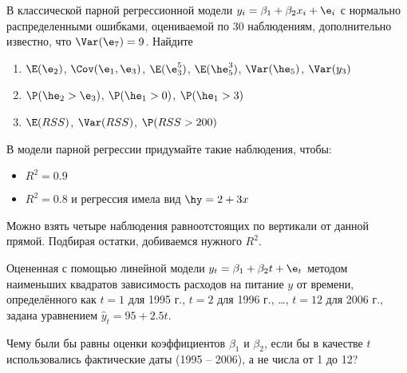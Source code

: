 \documentclass[pdftex,11pt,openany]{book}\usepackage[]{graphicx}\usepackage[]{color}
\begin{document}
\begin{problem}
 В классической парной регрессионной модели $y_i = \beta_1 + \beta_2 x_i + \e_i$ с нормально распределенными ошибками, оцениваемой по 30 наблюдениям, дополнительно известно, что $\Var(\e_7)=9$. Найдите
\begin{enumerate}
\item $\E(\e_2)$, $\Cov(\e_1,\e_3)$, $\E(\e_3^5)$, $\E(\he_5^3)$, $\Var(\he_5)$, $\Var(y_3)$
\item $\P(\he_2>\e_3)$, $\P(\he_1>0)$, $\P(\he_1>3)$
\item $\E(RSS)$, $\Var(RSS)$, $\P(RSS>200)$
\end{enumerate}
\end{problem}

\begin{solution}
\end{solution}


\begin{problem}
В модели парной регрессии придумайте такие наблюдения, чтобы:
\begin{itemize}
\item $R^2=0.9$
\item $R^2=0.8$ и регрессия имела вид $\hy=2+3x$
\end{itemize}
\end{problem}

\begin{solution}
 Можно взять четыре наблюдения равноотстоящих по вертикали от данной прямой. Подбирая остатки, добиваемся нужного $R^2$.
 \end{solution}



\begin{problem}
Оцененная с помощью линейной модели $y_t = \beta_1 + \beta_2 t + \e_t$ методом наименьших квадратов зависимость расходов на питание $y$ от времени, определённого как $t = 1$ для 1995 г., $t = 2$ для 1996 г., \ldots, $t = 12$ для 2006 г., задана уравнением $\hat{y}_t = 95 + 2.5 t$.

Чему были бы равны оценки коэффициентов $\beta_1$ и $\beta_2$, если бы в качестве $t$ использовались фактические даты (1995 – 2006), а не числа от 1 до 12?
\end{problem}
\end{document}

